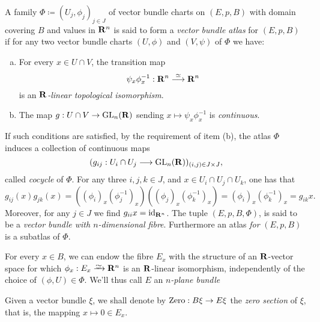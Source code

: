 \documentclass[../../../deep-dive]{subfile}
\begin{document}
\begin{definition}
    \label{def:vector-bundle-atlas}
    A family \(\Phi \coloneq (U_j, \phi_j)_{j \in J}\) of vector bundle charts on
    \((E, p, B)\) with domain covering \(B\) and values in \(\mathbf{R}^n\) is said to form
    a \emph{vector bundle atlas} for \((E, p, B)\) if for any two vector bundle
    charts \((U, \phi)\) and \((V, \psi)\) of \(\Phi\) we have:
    \begin{enumerate}[(a)]\setlength\itemsep{0em}
        \item For every \(x \in U \cap V\), the transition map
              \[
                  \psi_x \phi_x^{-1}: \mathbf{R}^n \overset{\simeq}\longrightarrow \mathbf{R}^n
              \]
              is an \emph{\(\mathbf{R}\)-linear topological isomorphism}.

        \item The map \(g: U \cap V \to \operatorname{GL}_n(\mathbf{R})\) sending
              \(x \mapsto \psi_x \phi_x^{-1}\) is \emph{continuous}.
    \end{enumerate}
    If such conditions are satisfied, by the requirement of item (b), the atlas
    \(\Phi\) induces a collection of continuous maps
    \[
        (g_{i j}: U_i \cap U_j \longrightarrow \operatorname{GL}_n(\mathbf{R}))_{(i, j) \in J \times J},
    \]
    called \emph{cocycle} of \(\Phi\). For any three \(i, j, k \in J\), and
    \(x \in U_i \cap U_j \cap U_k\), one has that
    \[
        g_{ij}(x) g_{j k}(x)
        = ((\phi_i)_x (\phi_j^{-1})_x) ((\phi_j)_x (\phi_k^{-1})_x)
        = (\phi_i)_x (\phi_k^{-1})_{x}
        = g_{i k} x.
    \]
    Moreover, for any \(j \in J\) we find \(g_{i i} x = \operatorname{id}_{\mathbf{R}^n}\). The tuple
    \((E, p, B, \Phi)\), is said to be a \emph{vector bundle with \(n\)-dimensional
        fibre}. Furthermore an atlas \emph{for} \((E, p, B)\) is a subatlas of
    \(\Phi\).

    For every \(x \in B\), we can endow the fibre \(E_x\) with the structure of an
    \(\mathbf{R}\)-vector space for which \(\phi_x: E_x \isoto \R^n\) is an \(\mathbf{R}\)-linear
    isomorphism, independently of the choice of \((\phi, U) \in \Phi\). We'll thus
    call \(E\) an \emph{\(n\)-plane bundle}
\end{definition}

\begin{definition}
    \label{def:zero-section}
    Given a vector bundle \(\xi\), we shall denote by \(\operatorname{Zero}: B \xi \to E \xi\)
    the \emph{zero section} of \(\xi\), that is, the mapping \(x \mapsto 0 \in E_x\).
\end{definition}
\end{document}
